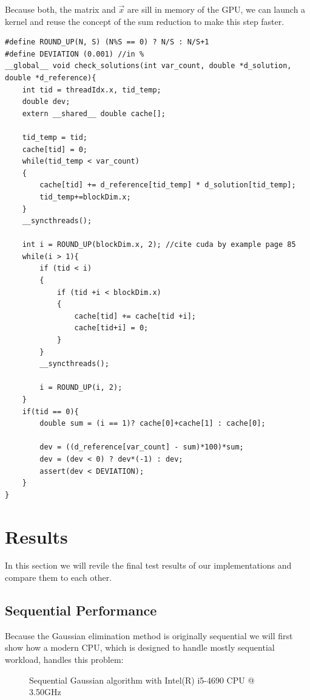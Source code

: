 \documentclass[draft, final]{vutinfth} %
\begin{document}
		Because both, the matrix and $\vec{x}$ are sill in memory of the GPU, we can launch a kernel and reuse the concept of the sum reduction to make this step faster.
		\begin{lstlisting}
#define ROUND_UP(N, S) (N%S == 0) ? N/S : N/S+1
#define DEVIATION (0.001) //in %
__global__ void check_solutions(int var_count, double *d_solution, double *d_reference){
	int tid = threadIdx.x, tid_temp;
	double dev;
	extern __shared__ double cache[];

	tid_temp = tid;
	cache[tid] = 0;
	while(tid_temp < var_count)
	{
		cache[tid] += d_reference[tid_temp] * d_solution[tid_temp];
		tid_temp+=blockDim.x;
	}
	__syncthreads();

	int i = ROUND_UP(blockDim.x, 2); //cite cuda by example page 85
	while(i > 1){
		if (tid < i)
		{
			if (tid +i < blockDim.x)
			{
				cache[tid] += cache[tid +i];
				cache[tid+i] = 0;
			}
		}
		__syncthreads();

		i = ROUND_UP(i, 2);
	}
	if(tid == 0){
		double sum = (i == 1)? cache[0]+cache[1] : cache[0];

		dev = ((d_reference[var_count] - sum)*100)*sum;
		dev = (dev < 0) ? dev*(-1) : dev;
		assert(dev < DEVIATION);
	}
}
		\end{lstlisting}


\chapter{Results}
\label{ch:results}
	In this section we will revile the final test results of our implementations and compare them to each other.

	\section{Sequential Performance}
		Because the Gaussian elimination method is originally sequential we will first show how a modern CPU, which is designed to handle mostly sequential workload, handles this problem:

		\begin{figure}[!ht]
			\centering
			\caption{Sequential Gaussian algorithm with Intel(R) i5-4690 CPU @ 3.50GHz}
		\end{figure}
\end{document}
